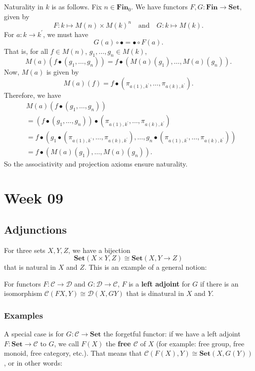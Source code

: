 \documentclass{amsbook}
\newcommand{\Catc}[1]{\mathcal{#1}}
\newcommand{\CC}{\Catc{C}}
\newcommand{\DD}{\Catc{D}}
\newcommand{\Catb}[1]{\mathbf{#1}}
\newcommand{\SET}{\Catb{Set}}
\newcommand{\FIN}{\Catb{Fin}}
\newcommand{\Ob}[1]{{#1}_0}
\newcommand{\Hom}[3]{{#1}(#2,#3)}
\begin{document}
  Naturality in $ k $ is as follows. Fix $ n \in \Ob \FIN $. We have functors $ F, G: \FIN \to \SET $, given by
  \[ F: k \mapsto M(n) \times M(k)^n \quad \text{and} \quad G: k \mapsto M(k). \]
  For $ a: k \to k^\prime $, we must have
  \[ G(a) \circ \bullet = \bullet \circ F(a). \]
  That is, for all $ f \in M(n) $, $ g_1, \dots, g_n \in M(k) $,
  \[ M(a) (f \bullet (g_1, \dots, g_n)) = f \bullet (M(a)(g_1), \dots, M(a)(g_n)). \]
  Now, $ M(a) $ is given by 
  \[ M(a)(f) = f \bullet (\pi_{a(1), k^\prime}, \dots, \pi_{a(k), k^\prime}). \]
  Therefore, we have
  \begin{align*}
    & M(a) (f \bullet (g_1, \dots, g_n))\\
    &= (f \bullet (g_1, \dots, g_n)) \bullet (\pi_{a(1), k^\prime}, \dots, \pi_{a(k), k^\prime})\\
    &= f \bullet (g_1 \bullet (\pi_{a(1), k^\prime}, \dots, \pi_{a(k), k^\prime}), \dots, g_n \bullet (\pi_{a(1), k^\prime}, \dots, \pi_{a(k), k^\prime}))\\
    &= f \bullet (M(a)(g_1), \dots, M(a)(g_n)).
  \end{align*}
  So the associativity and projection axioms ensure naturality.

  \chapter{Week 09}

  \section{Adjunctions}
  For three sets $ X, Y, Z $, we have a bijection
  \[ \Hom \SET {X \times Y} Z \cong \Hom \SET X {Y \to Z} \]
  that is natural in $ X $ and $ Z $. This is an example of a general notion:
  
  For functors $ F: \CC \to \DD $ and $ G: \DD \to \CC $, $ F $ is a \textbf{left adjoint} for $ G $ if there is an isomorphism $ \Hom \CC {F X} Y \cong \Hom \DD X {G Y} $ that is dinatural in $ X $ and $ Y $.

  \subsection{Examples}
  A special case is for $ G: \CC \to \SET $ the forgetful functor: if we have a left adjoint $ F: \SET \to \CC $ to $ G $, we call $ F(X) $ the \textbf{free $ \CC $} of $ X $ (for example: free group, free monoid, free category, etc.). That means that $ \Hom \CC {F(X)} Y \cong \Hom \SET X {G(Y)} $, or in other words:
\end{document}
